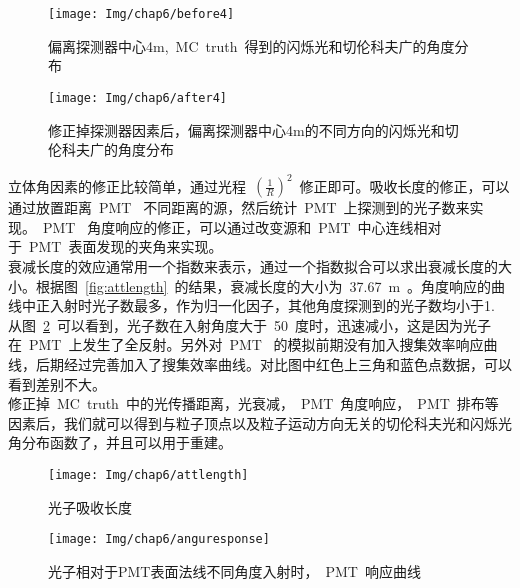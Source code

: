 \begin{figure}[!htbp]
\begin{minipage}[t]{0.48\linewidth}
  \centering
   \texttt{[image: Img/chap6/before4]}
    \caption{偏离探测器中心4m,~MC~truth~得到的闪烁光和切伦科夫广的角度分布}
  \label{fig:before4}
\end{minipage}
\quad\quad
\begin{minipage}[t]{0.48\linewidth}
  \centering
   \texttt{[image: Img/chap6/after4]}
    \caption{修正掉探测器因素后，偏离探测器中心4m的不同方向的闪烁光和切伦科夫广的角度分布}
  \label{fig:after4}
  \end{minipage}
\end{figure}
立体角因素的修正比较简单，通过光程~$\left ( \frac{1}{R} \right )^2 $~修正即可。吸收长度的修正，可以通过放置距离~PMT~ 不同距离的源，然后统计~PMT~上探测到的光子数来实现。~PMT~ 角度响应的修正，可以通过改变源和~PMT~中心连线相对于~PMT~表面发现的夹角来实现。\\
衰减长度的效应通常用一个指数来表示，通过一个指数拟合可以求出衰减长度的大小。根据图~\ref{fig:attlength}~的结果，衰减长度的大小为~37.67~m~。角度响应的曲线中正入射时光子数最多，作为归一化因子，其他角度探测到的光子数均小于1. 从图~\ref{fig:anguresponse}~可以看到，光子数在入射角度大于~50~度时，迅速减小，这是因为光子在~PMT~上发生了全反射。另外对~PMT~ 的模拟前期没有加入搜集效率响应曲线，后期经过完善加入了搜集效率曲线。对比图中红色上三角和蓝色点数据，可以看到差别不大。\\
修正掉~MC~truth~中的光传播距离，光衰减，~PMT~角度响应，~PMT~排布等因素后，我们就可以得到与粒子顶点以及粒子运动方向无关的切伦科夫光和闪烁光角分布函数了，并且可以用于重建。
\begin{figure}[!htbp]
\begin{minipage}[t]{0.48\linewidth}
  \centering
   \texttt{[image: Img/chap6/attlength]}
    \caption{光子吸收长度}
  \label{fig:attlength}
  \end{minipage}
   \quad\quad
\begin{minipage}[t]{0.48\linewidth}
  \centering
   \texttt{[image: Img/chap6/anguresponse]}
    \caption{光子相对于PMT表面法线不同角度入射时，~PMT~响应曲线}
  \label{fig:anguresponse}
\end{minipage}
\end{figure}

